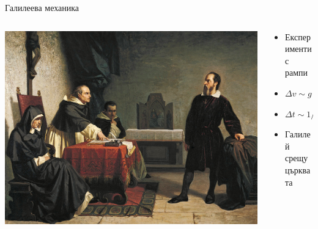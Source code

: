 \documentclass[10pt,a4paper]{beamer}
\begin{document}
        \begin{frame}{ Галилеева механика }
            \begin{columns}
                \begin{column}{0.5\textwidth}
                    \includegraphics[width=\textwidth]{images/galieli_inqusition.jpg}
                \end{column}
                \begin{column}{0.5\textwidth}
                    \begin{itemize}
                        \item Експерименти с рампи
                        \item $ \Delta v \sim g $
                        \item $ \Delta t \sim 1/g $
                        \item Галилей срещу църквата
                    \end{itemize}
                \end{column}
            \end{columns}
        \end{frame}
        
\end{document}
